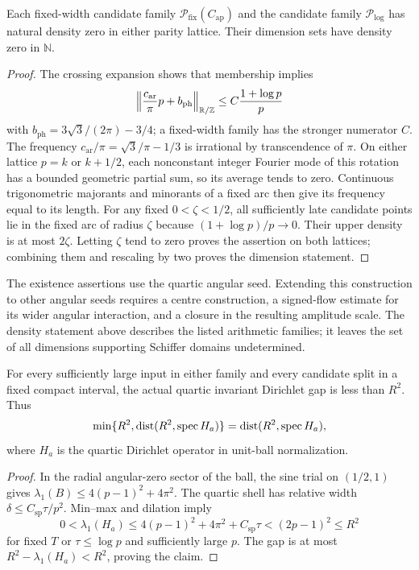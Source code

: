 \begin{proposition}
\label{inf:arithmetic-density}
Each fixed-width candidate family $\mathcal P_{\mathrm{fix}}(C_{\mathrm{ap}})$ and
the candidate family $\mathcal P_{\log}$ has natural density zero
in either parity lattice. Their dimension sets have density zero
in $\mathbb N$.
\end{proposition}
\begin{proof}
The crossing expansion shows that membership implies
\[
 \left\|\frac{c_{\mathrm{ar}}}{\pi}p+b_{\mathrm{ph}}\right\|_{\mathbb{R}/\mathbb{Z}}
 \le C\frac{1+\log p}{p}
\]
with $b_{\mathrm{ph}}=3\sqrt3/(2\pi)-3/4$; a fixed-width family
has the stronger numerator $C$.
The frequency $c_{\mathrm{ar}}/\pi=\sqrt3/\pi-1/3$ is irrational
by transcendence of $\pi$. On either lattice $p=k$ or $k+1/2$,
each nonconstant integer Fourier mode of this rotation has a bounded
geometric partial sum, so its average tends to zero.
Continuous trigonometric majorants and minorants of a fixed arc
\cite{inf:zygmund} then give its frequency equal to its length. For any fixed
$0<\zeta<1/2$, all sufficiently late candidate points lie in
the fixed arc of radius $\zeta$ because $(1+\log p)/p\to0$.
Their upper density is at most $2\zeta$. Letting $\zeta$ tend to
zero proves the assertion on both lattices; combining them and
rescaling by two proves the dimension statement.
\end{proof}

The existence assertions use the quartic angular seed. Extending this
construction to other angular seeds requires a centre construction,
a signed-flow estimate for its wider angular interaction, and a
closure in the resulting amplitude scale. The density statement
above describes the listed arithmetic families; it leaves the set
of all dimensions supporting Schiffer domains undetermined.

\begin{lemma}\label{inf:cap-inactive}
For every sufficiently large input in either family and every
candidate split in a fixed compact interval, the actual quartic
invariant Dirichlet gap is less than $R^2$. Thus
\[
 \min\{R^2,\operatorname{dist}(R^2,\operatorname{spec} H_a)\}
                  =\operatorname{dist}(R^2,\operatorname{spec} H_a),
\]
where $H_a$ is the quartic Dirichlet operator in unit-ball normalization.
\end{lemma}
\begin{proof}
In the radial angular-zero sector of the ball, the sine trial on
$(1/2,1)$ gives
$\lambda_1(B)\le4(p-1)^2+4\pi^2$.
The quartic shell has relative width $\delta\le C_{\mathrm{sp}}\tau/p^2$.
Min--max and dilation imply
\[
 0<\lambda_1(H_a)\le4(p-1)^2+4\pi^2+C_{\mathrm{sp}}\tau
       <(2p-1)^2\le R^2
\]
for fixed $T$ or $\tau\le\log p$ and sufficiently large $p$.
The gap is at most $R^2-\lambda_1(H_a)<R^2$, proving the claim.
\end{proof}

